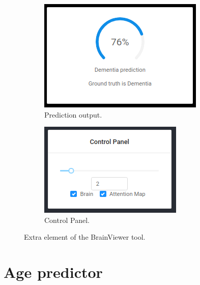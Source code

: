 \begin{figure}
\centering
\begin{subfigure}{.4\textwidth}
  \centering
  \includegraphics[width=1\linewidth]{figures/BrainViewer/info.png}
  \caption{Prediction output.}
  \label{fig:brainViever_pred_output}
\end{subfigure}%
\hfill
\begin{subfigure}{.4\textwidth}
  \centering
  \includegraphics[width=1\linewidth]{figures/BrainViewer/control_panel.png}
  \caption{Control Panel.}
  \label{fig:brainViever_control_panel}
\end{subfigure}
\caption[Elastic]{Extra element of the BrainViewer tool.}
\label{fig:brainViwer_extra}
\end{figure}


\chapter{Age predictor}
\label{chap:age_pred}
